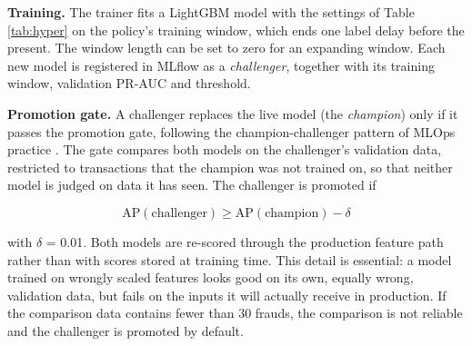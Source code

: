 \textbf{Training.} The trainer fits a LightGBM model with the settings of Table \ref{tab:hyper} on the policy's training window, which ends one label delay before the present. The window length can be set to zero for an expanding window. Each new model is registered in MLflow as a \textit{challenger}, together with its training window, validation PR-AUC and threshold.

\textbf{Promotion gate.} A challenger replaces the live model (the \textit{champion}) only if it passes the promotion gate, following the champion-challenger pattern of MLOps practice \cite{pulicharla2019,kodakandla2024}. The gate compares both models on the challenger's validation data, restricted to transactions that the champion was not trained on, so that neither model is judged on data it has seen. The challenger is promoted if

\begin{equation}
  \mathrm{AP}(\text{challenger}) \ge \mathrm{AP}(\text{champion}) - \delta
  \label{eq:gate}
\end{equation}

with $\delta$ = 0.01. Both models are re-scored through the production feature path rather than with scores stored at training time. This detail is essential: a model trained on wrongly scaled features looks good on its own, equally wrong, validation data, but fails on the inputs it will actually receive in production. If the comparison data contains fewer than 30 frauds, the comparison is not reliable and the challenger is promoted by default.

